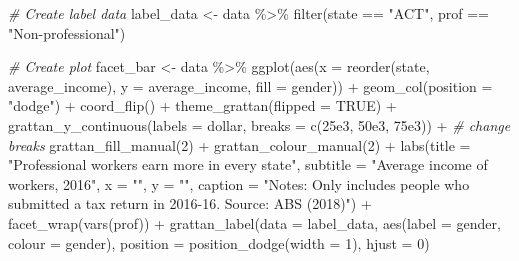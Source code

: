 \documentclass[
]{book}
\newenvironment{Shaded}{\begin{snugshade}}{\end{snugshade}}
\newcommand{\AttributeTok}[1]{\textcolor[rgb]{0.77,0.63,0.00}{#1}}
\newcommand{\CommentTok}[1]{\textcolor[rgb]{0.56,0.35,0.01}{\textit{#1}}}
\newcommand{\ConstantTok}[1]{\textcolor[rgb]{0.00,0.00,0.00}{#1}}
\newcommand{\DecValTok}[1]{\textcolor[rgb]{0.00,0.00,0.81}{#1}}
\newcommand{\FloatTok}[1]{\textcolor[rgb]{0.00,0.00,0.81}{#1}}
\newcommand{\FunctionTok}[1]{\textcolor[rgb]{0.00,0.00,0.00}{#1}}
\newcommand{\NormalTok}[1]{#1}
\newcommand{\OtherTok}[1]{\textcolor[rgb]{0.56,0.35,0.01}{#1}}
\newcommand{\SpecialCharTok}[1]{\textcolor[rgb]{0.00,0.00,0.00}{#1}}
\newcommand{\StringTok}[1]{\textcolor[rgb]{0.31,0.60,0.02}{#1}}
\begin{document}
\begin{Shaded}
\begin{Highlighting}[]
\CommentTok{\# Create label data}
\NormalTok{label\_data }\OtherTok{\textless{}{-}}\NormalTok{ data }\SpecialCharTok{\%\textgreater{}\%} 
  \FunctionTok{filter}\NormalTok{(state }\SpecialCharTok{==} \StringTok{"ACT"}\NormalTok{,}
\NormalTok{         prof }\SpecialCharTok{==} \StringTok{"Non{-}professional"}\NormalTok{)}

\CommentTok{\# Create plot}
\NormalTok{facet\_bar }\OtherTok{\textless{}{-}}\NormalTok{ data }\SpecialCharTok{\%\textgreater{}\%} 
  \FunctionTok{ggplot}\NormalTok{(}\FunctionTok{aes}\NormalTok{(}\AttributeTok{x =} \FunctionTok{reorder}\NormalTok{(state, average\_income),}
             \AttributeTok{y =}\NormalTok{ average\_income,}
             \AttributeTok{fill =}\NormalTok{ gender)) }\SpecialCharTok{+} 
  \FunctionTok{geom\_col}\NormalTok{(}\AttributeTok{position =} \StringTok{"dodge"}\NormalTok{) }\SpecialCharTok{+} 
  \FunctionTok{coord\_flip}\NormalTok{() }\SpecialCharTok{+} 
  \FunctionTok{theme\_grattan}\NormalTok{(}\AttributeTok{flipped =} \ConstantTok{TRUE}\NormalTok{) }\SpecialCharTok{+} 
  \FunctionTok{grattan\_y\_continuous}\NormalTok{(}\AttributeTok{labels =}\NormalTok{ dollar,}
                       \AttributeTok{breaks =} \FunctionTok{c}\NormalTok{(}\FloatTok{25e3}\NormalTok{, }\FloatTok{50e3}\NormalTok{, }\FloatTok{75e3}\NormalTok{)) }\SpecialCharTok{+}  \CommentTok{\# change breaks}
  \FunctionTok{grattan\_fill\_manual}\NormalTok{(}\DecValTok{2}\NormalTok{) }\SpecialCharTok{+} 
  \FunctionTok{grattan\_colour\_manual}\NormalTok{(}\DecValTok{2}\NormalTok{) }\SpecialCharTok{+} 
  \FunctionTok{labs}\NormalTok{(}\AttributeTok{title =} \StringTok{"Professional workers earn more in every state"}\NormalTok{,}
       \AttributeTok{subtitle =} \StringTok{"Average income of workers, 2016"}\NormalTok{,}
       \AttributeTok{x =} \StringTok{""}\NormalTok{,}
       \AttributeTok{y =} \StringTok{""}\NormalTok{,}
       \AttributeTok{caption =} \StringTok{"Notes: Only includes people who submitted a tax return in 2016{-}16. Source: ABS (2018)"}\NormalTok{) }\SpecialCharTok{+} 
  \FunctionTok{facet\_wrap}\NormalTok{(}\FunctionTok{vars}\NormalTok{(prof)) }\SpecialCharTok{+} 
  \FunctionTok{grattan\_label}\NormalTok{(}\AttributeTok{data =}\NormalTok{ label\_data,}
                \FunctionTok{aes}\NormalTok{(}\AttributeTok{label =}\NormalTok{ gender,}
                    \AttributeTok{colour =}\NormalTok{ gender),}
                \AttributeTok{position =} \FunctionTok{position\_dodge}\NormalTok{(}\AttributeTok{width =} \DecValTok{1}\NormalTok{), }
                \AttributeTok{hjust =} \DecValTok{0}\NormalTok{)}
\end{Highlighting}
\end{Shaded}
\end{document}
